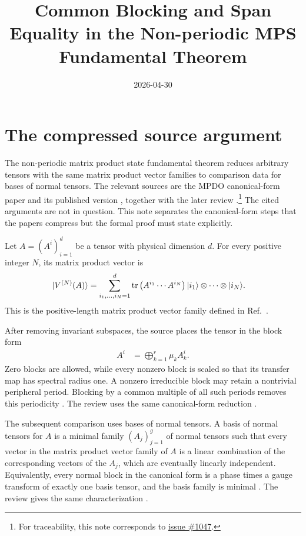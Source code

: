 \documentclass{article}
\title{Common Blocking and Span Equality in the Non-periodic MPS Fundamental Theorem}
\author{}
\date{2026-04-30}
\begin{document}
\maketitle
{}

\section{The compressed source argument}

The non-periodic matrix product state fundamental theorem reduces arbitrary
tensors with the same matrix product vector families to comparison data for
bases of normal tensors. The relevant sources are the MPDO canonical-form paper
and its published version
\cite{Cirac2016MPDO_arXiv,Cirac2017MPDO_AnnPhys}, together with the later review
\cite{Cirac2021Matrix}.\footnote{For traceability, this note corresponds to
\href{https://github.com/LionSR/TNLean/issues/1047}{issue \#1047}.}
The cited arguments are not in question. This note separates the canonical-form
steps that the papers compress but the formal proof must state explicitly.

Let $A=(A^i)_{i=1}^d$ be a tensor with physical dimension $d$. For every
positive integer $N$, its matrix product vector is
\begin{align}
    |V^{(N)}(A)\rangle
        &=
        \sum_{i_1,\ldots,i_N=1}^{d}
        \operatorname{tr}\left(A^{i_1}\cdots A^{i_N}\right)
        |i_1\rangle\otimes\cdots\otimes|i_N\rangle.
    \label{eq:rmp_common_blocking_span_equality_mpv_definition}
\end{align}
This is the positive-length matrix product vector family defined in
Ref.~\cite[lines~130--138]{Cirac2016MPDO_arXiv}.

After removing invariant subspaces, the source places the tensor in the block
form
\begin{align}
    A^i
        &=
        \bigoplus_{k=1}^{r}\mu_k A_k^i.
    \label{eq:rmp_common_blocking_span_equality_canonical_blocks}
\end{align}
Zero blocks are allowed, while every nonzero block is scaled so that its
transfer map has spectral radius one. A nonzero irreducible block may retain a
nontrivial peripheral period. Blocking by a common multiple of all such periods
removes this periodicity
\cite[lines~214--231]{Cirac2016MPDO_arXiv}. The review uses the same
canonical-form reduction \cite[lines~1798--1820]{Cirac2021Matrix}.

The subsequent comparison uses bases of normal tensors. A basis of normal
tensors for $A$ is a minimal family $(A_j)_{j=1}^{g}$ of normal tensors such
that every vector in the matrix product vector family of $A$ is a linear
combination of the corresponding vectors of the $A_j$, which are eventually
linearly independent. Equivalently, every normal block in the canonical form is
a phase times a gauge transform of exactly one basis tensor, and the basis
family is minimal
\cite[Proposition~\texttt{prop:char-BNT}, lines~271--280]{Cirac2016MPDO_arXiv}.
The review gives the same characterization
\cite[Proposition~\texttt{prop:char-BNT}, lines~1846--1859]{Cirac2021Matrix}.
\end{document}
